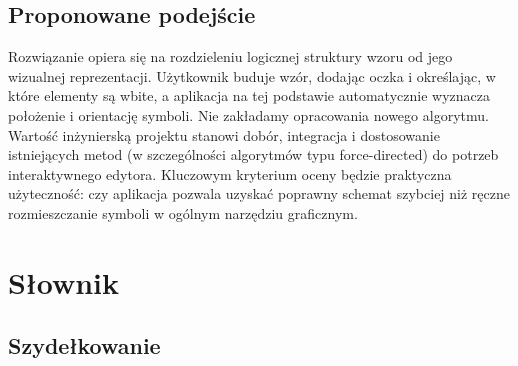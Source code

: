 \documentclass[a4paper,11pt]{article}
\begin{document}
\subsection{Proponowane podejście}

Rozwiązanie opiera się na rozdzieleniu logicznej struktury wzoru od jego wizualnej reprezentacji. Użytkownik buduje wzór, dodając oczka i określając, w które elementy są wbite, a aplikacja na tej podstawie automatycznie wyznacza położenie i orientację symboli. Nie zakładamy opracowania nowego algorytmu. Wartość inżynierską projektu stanowi dobór, integracja i dostosowanie istniejących metod (w szczególności algorytmów typu force-directed) do potrzeb interaktywnego edytora. Kluczowym kryterium oceny będzie praktyczna użyteczność: czy aplikacja pozwala uzyskać poprawny schemat szybciej niż ręczne rozmieszczanie symboli w ogólnym narzędziu graficznym.

\pagebreak

\section{Słownik}

\subsection{Szydełkowanie}
\end{document}
